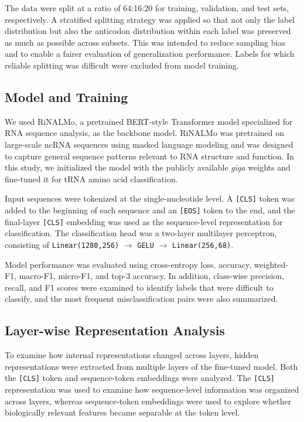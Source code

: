 \documentclass[a4paper,11pt,draft]{jsarticle}
\begin{document}
The data were split at a ratio of 64:16:20 for training, validation, and test sets, respectively. A stratified splitting strategy was applied so that not only the label distribution but also the anticodon distribution within each label was preserved as much as possible across subsets. This was intended to reduce sampling bias and to enable a fairer evaluation of generalization performance. Labels for which reliable splitting was difficult were excluded from model training.

\subsection{Model and Training}

We used RiNALMo\cite{penic2025rinalmo}, a pretrained BERT-style Transformer model specialized for RNA sequence analysis, as the backbone model. 
RiNALMo was pretrained on large-scale ncRNA sequences using masked language modeling and was designed to capture general sequence patterns relevant to RNA structure and function. 
In this study, we initialized the model with the publicly available \textit{giga} weights and fine-tuned it for tRNA amino acid classification.

Input sequences were tokenized at the single-nucleotide level. A \texttt{[CLS]} token was added to the beginning of each sequence and an \texttt{[EOS]} token to the end, and the final-layer \texttt{[CLS]} embedding was used as the sequence-level representation for classification. The classification head was a two-layer multilayer perceptron, consisting of \texttt{Linear(1280,256)} $\rightarrow$ \texttt{GELU} $\rightarrow$ \texttt{Linear(256,68)}.

Model performance was evaluated using cross-entropy loss, accuracy, weighted-F1, macro-F1, micro-F1, and top-3 accuracy. In addition, class-wise precision, recall, and F1 scores were examined to identify labels that were difficult to classify, and the most frequent misclassification pairs were also summarized.

\subsection{Layer-wise Representation Analysis}

To examine how internal representations changed across layers, hidden representations were extracted from multiple layers of the fine-tuned model. Both the \texttt{[CLS]} token and sequence-token embeddings were analyzed. The \texttt{[CLS]} representation was used to examine how sequence-level information was organized across layers, whereas sequence-token embeddings were used to explore whether biologically relevant features became separable at the token level.
\end{document}
